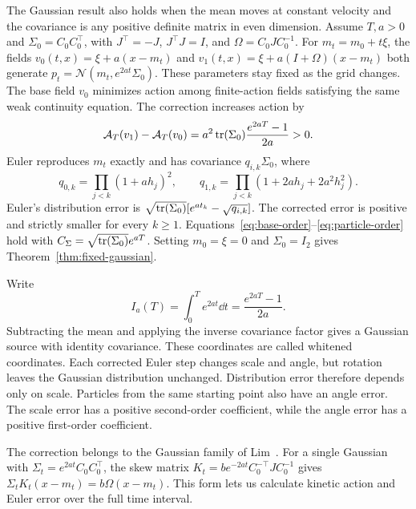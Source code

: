 The Gaussian result also holds when the mean moves at constant velocity and the covariance is any positive definite matrix in even dimension. Assume $T,a>0$ and $\Sigma_0=C_0C_0^\top$, with $J^\top=-J$, $J^\top J=I$, and $\Omega=C_0JC_0^{-1}$. For $m_t=m_0+t\xi$, the fields $v_0(t,x)=\xi+a(x-m_t)$ and $v_1(t,x)=\xi+a(I+\Omega)(x-m_t)$ both generate $p_t=\mathcal N(m_t,e^{2at}\Sigma_0)$. These parameters stay fixed as the grid changes. The base field $v_0$ minimizes action among finite-action fields satisfying the same weak continuity equation. The correction increases action by
\[
 \mathcal A_T(v_1)-\mathcal A_T(v_0)=a^2\operatorname{tr}(\Sigma_0)\frac{e^{2aT}-1}{2a}>0.
\]
Euler reproduces $m_t$ exactly and has covariance $q_{i,k}\Sigma_0$, where
\[
 q_{0,k}=\prod_{j<k}(1+ah_j)^2,\qquad
 q_{1,k}=\prod_{j<k}(1+2ah_j+2a^2h_j^2).
\]
Euler's distribution error is $\sqrt{\operatorname{tr}(\Sigma_0)}[e^{at_k}-\sqrt{q_{i,k}}]$. The corrected error is positive and strictly smaller for every $k\ge1$. Equations~\eqref{eq:base-order}--\eqref{eq:particle-order} hold with $C_\Sigma=\sqrt{\operatorname{tr}(\Sigma_0)}e^{aT}$. Setting $m_0=\xi=0$ and $\Sigma_0=I_2$ gives Theorem~\ref{thm:fixed-gaussian}.

Write
\[
 I_a(T)=\int_0^T e^{2at}\dd t=\frac{e^{2aT}-1}{2a}.
\]
Subtracting the mean and applying the inverse covariance factor gives a Gaussian source with identity covariance. These coordinates are called whitened coordinates. Each corrected Euler step changes scale and angle, but rotation leaves the Gaussian distribution unchanged. Distribution error therefore depends only on scale. Particles from the same starting point also have an angle error. The scale error has a positive second-order coefficient, while the angle error has a positive first-order coefficient.

The correction belongs to the Gaussian family of Lim~\citep[Proposition~5.5]{lim2025hidden}. For a single Gaussian with $\Sigma_t=e^{2at}C_0C_0^\top$, the skew matrix $K_t=b e^{-2at}C_0^{-\top}JC_0^{-1}$ gives $\Sigma_tK_t(x-m_t)=b\Omega(x-m_t)$. This form lets us calculate kinetic action and Euler error over the full time interval.

